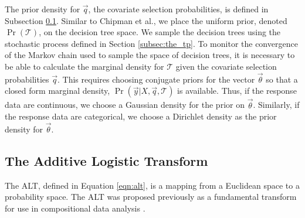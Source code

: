 The prior density for $\vec{q}$, the covariate selection probabilities, is defined in Subsection \ref{subsec:alt}. Similar to Chipman et al., we place the uniform prior, denoted $\Pr(\mathcal{T})$, on the decision tree space. We sample the decision trees using the stochastic process defined in Section \ref{subsec:the_tp}.  To monitor the convergence of the Markov chain used to sample the space of decision trees, it is necessary to be able to calculate the marginal density for $\mathcal{T}$ given the covariate selection probabilities $\vec{q}$. This requires choosing conjugate priors for the vector $\vec{\theta}$ so that a closed form marginal density, $\Pr(\vec{y}\vert X,\vec{q},\mathcal{T})$ is available. Thus, if the response data are continuous, we choose a Gaussian density for the prior on $\vec{\theta}$. Similarly, if the response data are categorical, we choose a Dirichlet density as the prior density for $\vec{\theta}$.  

	\subsection{The Additive Logistic Transform}\label{subsec:alt}
	
	The ALT, defined in Equation \ref{eqn:alt}, is a mapping from a Euclidean space to a probability space. 
	The ALT was proposed previously as a fundamental transform for use in compositional data analysis \cite{aitchison1986statistical}. 
	
